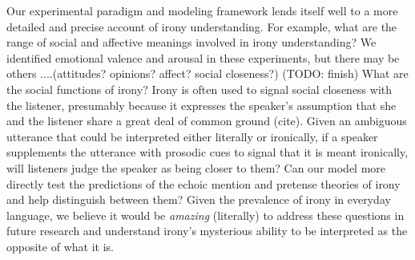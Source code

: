 \documentclass[10pt,letterpaper]{article}
\begin{document}
Our experimental paradigm and modeling framework lends itself well to a more detailed and precise account of irony understanding. For example, what are the range of social and affective meanings involved in irony understanding? We identified emotional valence and arousal in these experiments, but there may be others ....(attitudes? opinions? affect? social closeness?)
(TODO: finish) What are the social functions of irony? Irony is often used to signal social closeness with the listener, presumably because it expresses the speaker's assumption that she and the listener share a great deal of common ground (cite). Given an ambiguous utterance that could be interpreted either literally or ironically, if a speaker supplements the utterance with prosodic cues to signal that it is meant ironically, will listeners judge the speaker as being closer to them? Can our model more directly  test the predictions of the echoic mention and pretense theories of irony and help distinguish between them? Given the prevalence of irony in everyday language, we believe it would be \emph{amazing} (literally) to address these questions in future research and understand irony's mysterious ability to be interpreted as the opposite of what it is.




\setlength{\bibleftmargin}{.125in}
\setlength{\bibindent}{-\bibleftmargin}


\end{document}
